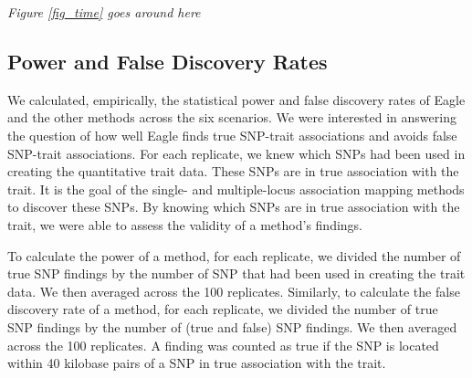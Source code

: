 \documentclass{nature}
\begin{document}
  

 
{\em Figure \ref{fig_time} goes around here}





\subsection{Power and False Discovery Rates}

We calculated, empirically, the statistical power and false discovery rates of Eagle and the other methods across the six scenarios. 
We were interested in answering the question of how well Eagle finds true SNP-trait associations and avoids false SNP-trait associations. 
For each replicate, we knew which SNPs had been used in creating the quantitative trait data. These SNPs are in true association with 
the trait. It is the goal of the single- and multiple-locus association mapping methods to discover these SNPs. By knowing which SNPs are in true 
association with the trait, we were able to assess the validity of a  method's findings.  


To calculate the power of a method, for each replicate, we divided the number of true SNP findings by the number of SNP that had been used 
in creating the trait data. We then averaged across the 100 replicates.  
Similarly, to calculate the false discovery rate of a method, 
for each replicate, 
we divided the number of true SNP findings by the number of (true and false) SNP findings. We then averaged across the 100 replicates.  
A finding was counted as true if the SNP is located within 40 kilobase pairs of a SNP in true 
association with the trait. 
\end{document}
